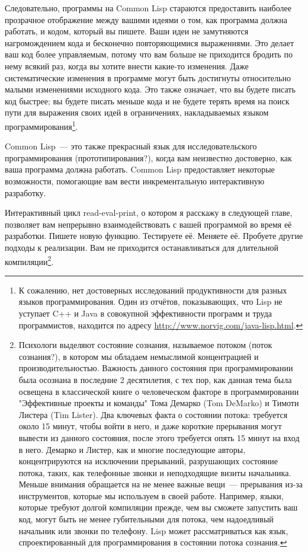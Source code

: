 Следовательно, программы на Common Lisp стараются предоставить наиболее прозрачное
отображение между вашими идеями о том, как программа должна работать, и кодом, который вы
пишете. Ваши идеи не замутняются нагромождением кода и бесконечно повторяющимися
выражениями. Это делает ваш код более управляемым, потому что вам больше не приходится
бродить по нему всякий раз, когда вы хотите внести какие-то изменения. Даже
систематические изменения в программе могут быть достигнуты относительно малыми
изменениями исходного кода. Это также означает, что вы будете писать код быстрее; вы
будете писать меньше кода и не будете терять время на поиск пути для выражения своих идей
в ограничениях, накладываемых языком программирования\footnote{К сожалению, нет
  достоверных исследований продуктивности для разных языков программирования. Один из
  отчётов, показывающих, что Lisp не уступает C++ и Java в совокупной эффективности
  программ и труда программистов, находится по адресу
  \url{http://www.norvig.com/java-lisp.html}.}.

Common Lisp~--- это также прекрасный язык для исследовательского программирования
(прототипирования?), когда вам неизвестно достоверно, как ваша программа должна
работать. Common Lisp предоставляет некоторые возможности, помогающие вам вести
инкрементальную интерактивную разработку.

Интерактивный цикл read-eval-print, о котором я расскажу в следующей главе, позволяет вам
непрерывно взаимодействовать с вашей программой во время её разработки. Пишете новую
функцию. Тестируете её. Меняете её. Пробуете другие подходы к реализации. Вам не
приходится останавливаться для длительной компиляции\footnote{Психологи выделяют состояние
  сознания, называемое потоком (поток сознания?), в котором мы обладаем немыслимой
  концентрацией и производительностью. Важность данного состояния при программировании
  была осознана в последние 2 десятилетия, с тех пор, как данная тема была освещена в
  классической книге о человеческом факторе в программировании "Эффективные проекты и
  команды" Тома Демарко (Tom DeMarko) и Тимоти Листера (Tim Lister). Два ключевых факта о
  состоянии потока: требуется около 15 минут, чтобы войти в него, и даже короткие
  прерывания могут вывести из данного состояния, после этого требуется опять 15 минут на
  вход в него. Демарко и Листер, как и многие последующие авторы, концентрируются на
  исключении прерываний, разрушающих состояние потока, таких, как телефонные звонки и
  неподходящие визиты начальника. Меньше внимания обращается на не менее важные вещи~---
  прерывания из-за инструментов, которые мы используем в своей работе. Например, языки,
  которые требуют долгой компиляции прежде, чем вы сможете запустить ваш код, могут быть
  не менее губительными для потока, чем надоедливый начальник или звонки по телефону. Lisp
  может рассматриваться как язык, спроектированный для программирования в состоянии потока
  сознания.}.

